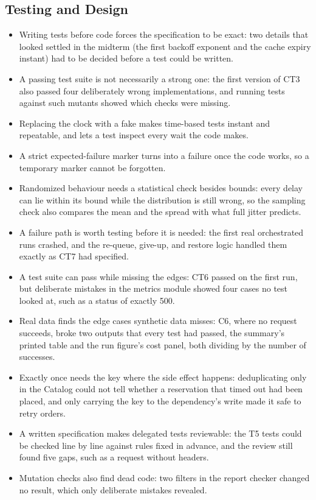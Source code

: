 \documentclass[10pt]{article}
\begin{document}
\subsection{Testing and Design}
\begin{itemize}
  \item Writing tests before code forces the specification to be exact: two
  details that looked settled in the midterm (the first backoff exponent and
  the cache expiry instant) had to be decided before a test could be written.
  \item A passing test suite is not necessarily a strong one: the first
  version of CT3 also passed four deliberately wrong implementations, and
  running tests against such mutants showed which checks were missing.
  \item Replacing the clock with a fake makes time-based tests instant and
  repeatable, and lets a test inspect every wait the code makes.
  \item A strict expected-failure marker turns into a failure once the code
  works, so a temporary marker cannot be forgotten.
  \item Randomized behaviour needs a statistical check besides bounds: every
  delay can lie within its bound while the distribution is still wrong, so the
  sampling check also compares the mean and the spread with what full jitter
  predicts.
  \item A failure path is worth testing before it is needed: the first real
  orchestrated runs crashed, and the re-queue, give-up, and restore logic
  handled them exactly as CT7 had specified.
  \item A test suite can pass while missing the edges: CT6 passed on the first
  run, but deliberate mistakes in the metrics module showed four cases no test
  looked at, such as a status of exactly 500.
  \item Real data finds the edge cases synthetic data misses: C6, where no
  request succeeds, broke two outputs that every test had passed, the summary's
  printed table and the run figure's cost panel, both dividing by the number of
  successes.
  \item Exactly once needs the key where the side effect happens:
  deduplicating only in the Catalog could not tell whether a reservation that
  timed out had been placed, and only carrying the key to the dependency's write
  made it safe to retry orders.
  \item A written specification makes delegated tests reviewable: the T5
  tests could be checked line by line against rules fixed in advance, and the
  review still found five gaps, such as a request without headers.
  \item Mutation checks also find dead code: two filters in the report checker
  changed no result, which only deliberate mistakes revealed.
\end{itemize}
\end{document}
